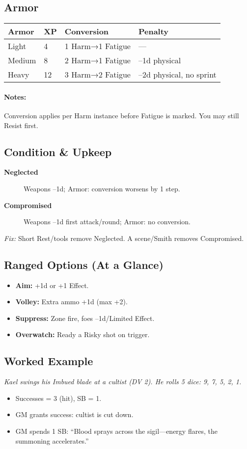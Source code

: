 \subsection{Armor}
\begin{tabular}{llll}
\toprule
\textbf{Armor} & \textbf{XP} & \textbf{Conversion} & \textbf{Penalty} \\
\midrule
Light  & 4  & 1 Harm→1 Fatigue & — \\
Medium & 8  & 2 Harm→1 Fatigue & –1d physical \\
Heavy  & 12 & 3 Harm→2 Fatigue & –2d physical, no sprint \\
\bottomrule
\end{tabular}

\paragraph{Notes:} Conversion applies per Harm instance before Fatigue is marked. You may still Resist first.

\subsection{Condition \& Upkeep}
\begin{description}
  \item[\textbf{Neglected}] Weapons –1d; Armor: conversion worsens by 1 step.
  \item[\textbf{Compromised}] Weapons –1d first attack/round; Armor: no conversion.
\end{description}
\emph{Fix:} Short Rest/tools remove Neglected. A scene/Smith removes Compromised.

\subsection{Ranged Options (At a Glance)}
\begin{itemize}
  \item \textbf{Aim:} +1d or +1 Effect.  
  \item \textbf{Volley:} Extra ammo +1d (max +2).  
  \item \textbf{Suppress:} Zone fire, foes –1d/Limited Effect.  
  \item \textbf{Overwatch:} Ready a Risky shot on trigger.  
\end{itemize}

\subsection{Worked Example}
\emph{Kael swings his Imbued blade at a cultist (DV 2). He rolls 5 dice: 9, 7, 5, 2, 1.}
\begin{itemize}
  \item Successes = 3 (hit), SB = 1.
  \item GM grants success: cultist is cut down.
  \item GM spends 1 SB: ``Blood sprays across the sigil—energy flares, the summoning accelerates.''
\end{itemize}
